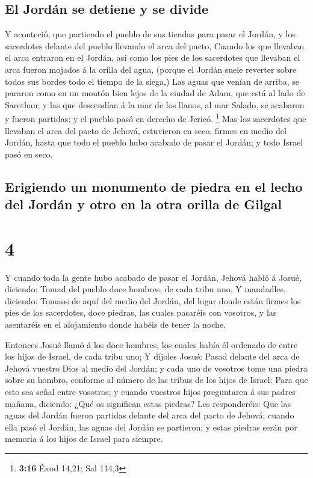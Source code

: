 \hypertarget{el-jorduxe1n-se-detiene-y-se-divide}{%
\subsection{El Jordán se detiene y se
divide}\label{el-jorduxe1n-se-detiene-y-se-divide}}

 Y aconteció, que partiendo el pueblo de sus tiendas para
pasar el Jordán, y los sacerdotes delante del pueblo llevando el arca
del pacto,  Cuando los que llevaban el arca entraron en el
Jordán, así como los pies de los sacerdotes que llevaban el arca fueron
mojados á la orilla del agua, (porque el Jordán suele reverter sobre
todos sus bordes todo el tiempo de la siega,)  Las aguas
que venían de arriba, se pararon como en un montón bien lejos de la
ciudad de Adam, que está al lado de Sarethan; y las que descendían á la
mar de los llanos, al mar Salado, se acabaron y fueron partidas; y el
pueblo pasó en derecho de Jericó. \footnote{\textbf{3:16} Éxod 14,21;
  Sal 114,3}  Mas los sacerdotes que llevaban el arca del
pacto de Jehová, estuvieron en seco, firmes en medio del Jordán, hasta
que todo el pueblo hubo acabado de pasar el Jordán; y todo Israel pasó
en seco.

\hypertarget{erigiendo-un-monumento-de-piedra-en-el-lecho-del-jorduxe1n-y-otro-en-la-otra-orilla-de-gilgal}{%
\subsection{Erigiendo un monumento de piedra en el lecho del Jordán y
otro en la otra orilla de
Gilgal}\label{erigiendo-un-monumento-de-piedra-en-el-lecho-del-jorduxe1n-y-otro-en-la-otra-orilla-de-gilgal}}

\hypertarget{section-3}{%
\section{4}\label{section-3}}

 Y cuando toda la gente hubo acabado de pasar el Jordán,
Jehová habló á Josué, diciendo:  Tomad del pueblo doce
hombres, de cada tribu uno,  Y mandadles, diciendo: Tomaos
de aquí del medio del Jordán, del lugar donde están firmes los pies de
los sacerdotes, doce piedras, las cuales pasaréis con vosotros, y las
asentaréis en el alojamiento donde habéis de tener la noche.

 Entonces Josué llamó á los doce hombres, los cuales había
él ordenado de entre los hijos de Israel, de cada tribu uno;
 Y díjoles Josué: Pasad delante del arca de Jehová vuestro
Dios al medio del Jordán; y cada uno de vosotros tome una piedra sobre
su hombro, conforme al número de las tribus de los hijos de Israel;
 Para que esto sea señal entre vosotros; y cuando vuestros
hijos preguntaren á sus padres mañana, diciendo: ¿Qué os significan
estas piedras?  Les responderéis: Que las aguas del Jordán
fueron partidas delante del arca del pacto de Jehová; cuando ella pasó
el Jordán, las aguas del Jordán se partieron: y estas piedras serán por
memoria á los hijos de Israel para siempre.

